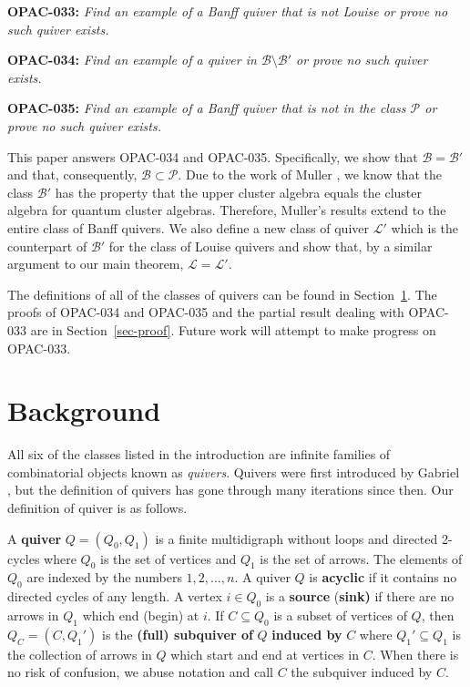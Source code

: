 \documentclass[ALCO,Unicode]{cedram}
\newcommand{\BB}{\mathcal{B}}
\newcommand{\PP}{\mathcal{P}}
\newcommand{\LL}{\mathcal{L}}
\begin{document}
\textbf{OPAC-033:} \textit{Find an example of a Banff quiver that is not Louise or prove no such quiver exists.} 

\textbf{OPAC-034:} \textit{Find an example of a quiver in $\BB \setminus \BB'$  or prove no such quiver exists.}

\textbf{OPAC-035:} \textit{Find an example of a Banff quiver that is not in the class $\PP$ or prove no such quiver exists.}

This paper answers OPAC-034 and OPAC-035.
Specifically, we show that $\BB = \BB'$ and that, consequently, $\BB \subset \PP$.
Due to the work of Muller \cite[Lemma 8.13]{MR3551171}, we know that the class $\BB'$ has the property that the upper cluster algebra equals the cluster algebra for quantum cluster algebras. 
Therefore, Muller's results extend to the entire class of Banff quivers.
We also define a new class of quiver $\LL'$ which is the counterpart of $\BB'$ for the class of Louise quivers and show that, by a similar argument to our main theorem, $\LL = \LL'$. 

The definitions of all of the classes of quivers can be found in Section~\ref{sec-background}.
The proofs of OPAC-034 and OPAC-035 and the partial result dealing with OPAC-033 are in Section~\ref{sec-proof}. 
Future work will attempt to make progress on OPAC-033.

\section{Background}\label{sec-background}

All six of the classes listed in the introduction are infinite families of combinatorial objects known as \textit{quivers}.
Quivers were first introduced by Gabriel \cite{MR0332887}, but the definition of quivers has gone through many iterations since then.
Our definition of quiver is as follows.

\begin{defi}\label{def-quiver}
    A \textbf{quiver} $Q = (Q_0, Q_1)$ is a finite multidigraph without loops and directed 2-cycles where $Q_0$ is the set of vertices and $Q_1$ is the set of arrows.
    The elements of $Q_0$ are indexed by the numbers $1, 2, \ldots, n$. 
    A quiver $Q$ is \textbf{acyclic} if it contains no directed cycles of any length.
    A vertex $i \in Q_0$ is a \textbf{source} (\resp \textbf{sink)} if there are no arrows in $Q_1$ which end (\resp begin) at $i$.
    If $C \subseteq Q_0$ is a subset of vertices of $Q$, then $Q_C = (C, Q_1')$ is the \textbf{(full) subquiver of} $Q$ \textbf{induced by} $C$ where $Q_1' \subseteq Q_1$ is the collection of arrows in $Q$ which start and end at vertices in $C$.
    When there is no risk of confusion, we abuse notation and call $C$ the subquiver induced by $C$.
\end{defi}
\end{document}
